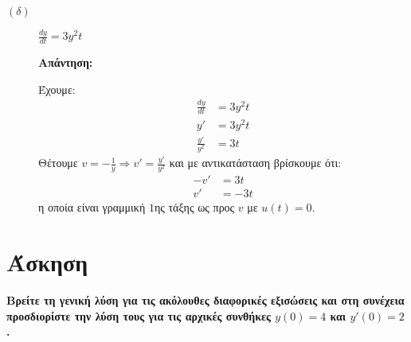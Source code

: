 \documentclass[a4paper,12pt]{article}
\begin{document}
\begin{description}
\vspace{\baselineskip}

\item [$(\delta)$] $\boxed{\frac{dy}{dt}=3y^2t}$

\textbf{Απάντηση:}

\vspace{\baselineskip}

Έχουμε:
\begin{align*}
\frac{dy}{dt} &=3y^2t \\
y'&=3y^2t \\
\frac{y'}{y^2} &= 3t
\end{align*}
Θέτουμε $v=-\frac{1}{y}\Rightarrow v'=\frac{y'}{y^2}$ και με αντικατάσταση βρίσκουμε ότι:
\begin{align*}
-v'&=3t \\
v'&=-3t
\end{align*}
η οποία είναι γραμμική $1$ης τάξης ως προς $v$ με $u(t)=0$.




\end{description}

\vspace{2\baselineskip}

\section{Άσκηση} {\bfseries Βρείτε τη γενική λύση για τις ακόλουθες διαφορικές εξισώσεις και στη συνέχεια προσδιορίστε την λύση τους για τις αρχικές συνθήκες $y(0)=4$ και $y'(0)=2$. }

\vspace{2\baselineskip}
\end{document}
